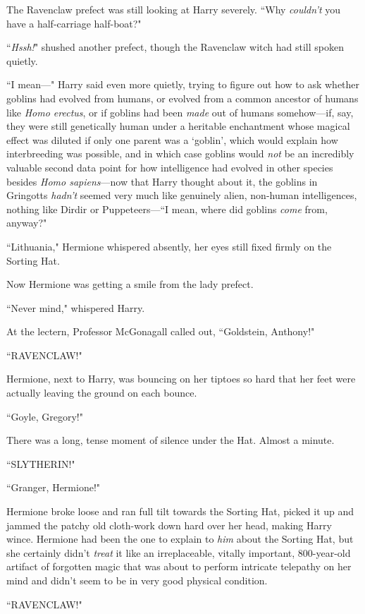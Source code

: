The Ravenclaw prefect was still looking at Harry severely. ``Why \emph{couldn't} you have a half-carriage half-boat?"

``\emph{Hssh!}" shushed another prefect, though the Ravenclaw witch had still spoken quietly.

``I mean—" Harry said even more quietly, trying to figure out how to ask whether goblins had evolved from humans, or evolved from a common ancestor of humans like \emph{Homo erectus}, or if goblins had been \emph{made} out of humans somehow—if, say, they were still genetically human under a heritable enchantment whose magical effect was diluted if only one parent was a `goblin', which would explain how interbreeding was possible, and in which case goblins would \emph{not} be an incredibly valuable second data point for how intelligence had evolved in other species besides \emph{Homo sapiens}—now that Harry thought about it, the goblins in Gringotts \emph{hadn't} seemed very much like genuinely alien, non-human intelligences, nothing like Dirdir or Puppeteers—``I mean, where did goblins \emph{come} from, anyway?"

``Lithuania," Hermione whispered absently, her eyes still fixed firmly on the Sorting Hat.

Now Hermione was getting a smile from the lady prefect.

``Never mind," whispered Harry.

At the lectern, Professor McGonagall called out, ``Goldstein, Anthony!"

``RAVENCLAW!"

Hermione, next to Harry, was bouncing on her tiptoes so hard that her feet were actually leaving the ground on each bounce.

``Goyle, Gregory!"

There was a long, tense moment of silence under the Hat. Almost a minute.

``SLYTHERIN!"

``Granger, Hermione!"

Hermione broke loose and ran full tilt towards the Sorting Hat, picked it up and jammed the patchy old cloth-work down hard over her head, making Harry wince. Hermione had been the one to explain to \emph{him} about the Sorting Hat, but she certainly didn't \emph{treat} it like an irreplaceable, vitally important, 800-year-old artifact of forgotten magic that was about to perform intricate telepathy on her mind and didn't seem to be in very good physical condition.

``RAVENCLAW!"

